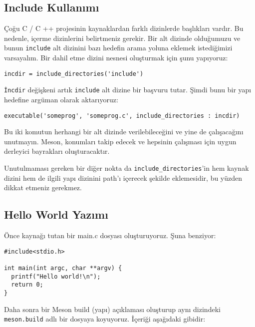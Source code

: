 \documentclass[
]{book}
\begin{document}
\hypertarget{include-kullanux131mux131}{%
\subsection{Include Kullanımı}\label{include-kullanux131mux131}}

Çoğu C / C ++ projesinin kaynaklardan farklı dizinlerde başlıkları vardır. Bu nedenle, içerme dizinlerini belirtmeniz gerekir. Bir alt dizinde olduğumuzu ve bunun \texttt{include} alt dizinini bazı hedefin arama yoluna eklemek istediğimizi varsayalım. Bir dahil etme dizini nesnesi oluşturmak için şunu yapıyoruz:

\begin{verbatim}
incdir = include_directories('include')
\end{verbatim}

\texttt{İncdir} değişkeni artık \texttt{include} alt dizine bir başvuru tutar. Şimdi bunu bir yapı hedefine argüman olarak aktarıyoruz:

\begin{verbatim}
executable('someprog', 'someprog.c', include_directories : incdir)
\end{verbatim}

Bu iki komutun herhangi bir alt dizinde verilebileceğini ve yine de çalışacağını unutmayın. Meson, konumları takip edecek ve hepsinin çalışması için uygun derleyici bayrakları oluşturacaktır.

Unutulmaması gereken bir diğer nokta da \texttt{include\_directories}'in hem kaynak dizini hem de ilgili yapı dizinini path'ı içerecek şekilde eklemesidir, bu yüzden dikkat etmeniz gerekmez.

\hypertarget{hello-world-yazux131mux131}{%
\subsection{Hello World Yazımı}\label{hello-world-yazux131mux131}}

Önce kaynağı tutan bir main.c dosyası oluşturuyoruz. Şuna benziyor:

\begin{verbatim}
#include<stdio.h>

int main(int argc, char **argv) {
  printf("Hello world!\n");
  return 0;
}
\end{verbatim}

Daha sonra bir Meson build (yapı) açıklaması oluşturup aynı dizindeki \texttt{meson.build} adlı bir dosyaya koyuyoruz. İçeriği aşağıdaki gibidir:
\end{document}
